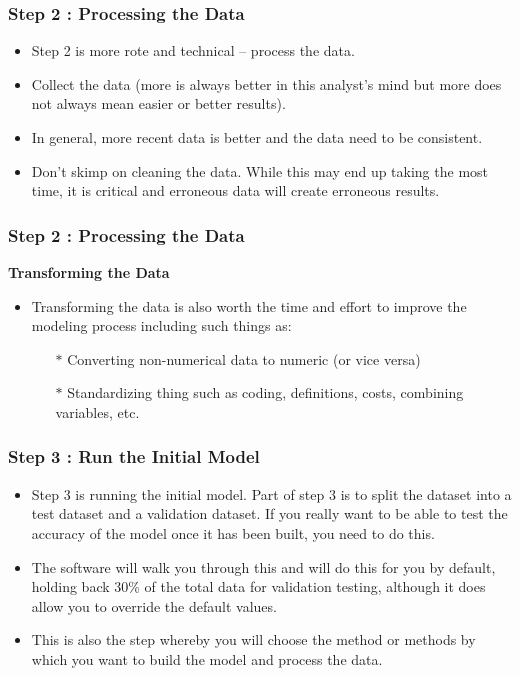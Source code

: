 \documentclass[PredictiveAnalytics101.tex]{subfiles}
\begin{document}
\begin{frame}
	\frametitle{Step 2 : Processing the Data}
	\Large
	\begin{itemize}
\item Step 2 is more rote and technical – process the data.
\item Collect the data (more is always better in this
analyst’s mind but more does not always mean easier or better results).
\item In general, more recent data is
better and the data need to be consistent. \item Don’t skimp on cleaning the data. While this may end up
taking the most time, it is critical and erroneous data will create erroneous results.
	\end{itemize}

\end{frame}
\begin{frame}
	\frametitle{Step 2 : Processing the Data}
\Large
\textbf{Transforming the Data}
\begin{itemize}
\item Transforming the
data is also worth the time and effort to improve the modeling process including such things as:
\begin{itemize}
\item[$\ast$] Converting non-numerical data to numeric (or vice versa)
\item[$\ast$] Standardizing thing such as coding, definitions, costs, combining variables, etc.
\end{itemize}
\end{itemize}

\end{frame}
\begin{frame}
	\frametitle{Step 3 : Run the Initial Model}
\Large
\begin{itemize}
\item Step 3 is running the initial model. Part of step 3 is to split the dataset into a test dataset and a
validation dataset. If you really want to be able to test the accuracy of the model once it has been built,
you need to do this.
\item The software will walk you through this and will do this for you by default, holding
back 30\% of the total data for validation testing, although it does allow you to override the default
values. 
\item This is also the step whereby you will choose the method or methods by which you want to
build the model and process the data. 
\end{itemize}

\end{frame}
\end{document}
